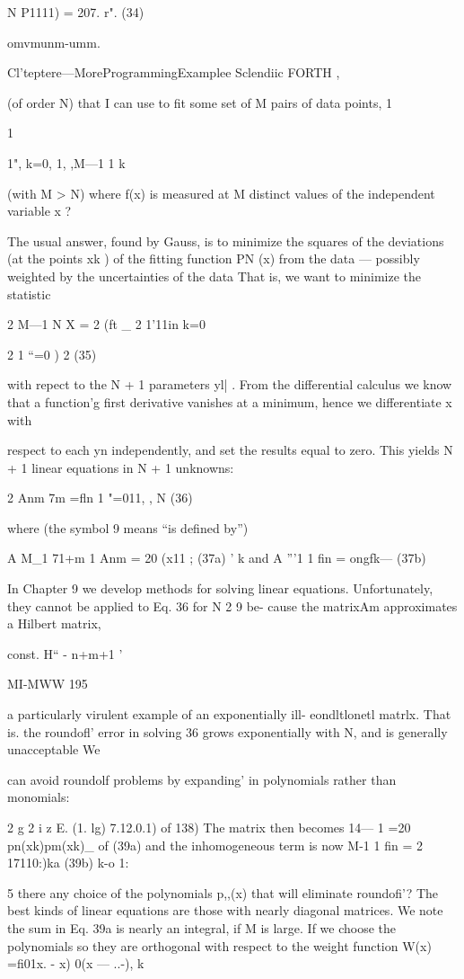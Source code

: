 N
P1111) = 207. r". (34)

omvmunm-umm.

Cl'teptere—MoreProgrammingExamplee Sclendiic FORTH ,

(of order N) that I can use to ﬁt some set of M pairs of data points, 1

1

{1"}, k=0, 1, ,M—1 1
k

(with M > N) where f(x) is measured at M distinct values of the
independent variable x ?

The usual answer, found by Gauss, is to minimize the squares of
the deviations (at the points xk ) of the ﬁtting function PN (x) from
the data — possibly weighted by the uncertainties of the data That
is, we want to minimize the statistic

2 M—1 N
X = 2 (ft _ 2 1’11in
k=0

2 1
“=0 ) 2 (35)

with repect to the N + 1 parameters yl| .
From the differential calculus we know that a function’g ﬁrst
derivative vanishes at a minimum, hence we differentiate x with

respect to each yn independently, and set the results equal to
zero. This yields N + 1 linear equations in N + 1 unknowns:

2 Anm 7m =ﬂn 1 "=011, , N (36)

where (the symbol 9 means “is deﬁned by”)

A M_1 71+m 1
Anm = 20 (x11 ; (37a)
' k
and
A ”'1 1
ﬁn = ongfk— (37b)

In Chapter 9 we develop methods for solving linear equations.
Unfortunately, they cannot be applied to Eq. 36 for N 2 9 be-
cause the matrixAm approximates a Hilbert matrix,

 

const.
H“ - n+m+1 ’

MI-MWW 195

a particularly virulent example of an exponentially ill-
eondltlonetl matrlx. That is. the roundofl' error in solving 36
grows exponentially with N, and is generally unacceptable We

can avoid roundolf problems by expanding' in polynomials rather
than monomials:

2 g 2 i
z E. (1. lg) 7.12.0.1) of 138)
The matrix then becomes
14— 1
=20 pn(xk)pm(xk)_ of (39a)
and the inhomogeneous term is now
M-1 1
ﬁn = 2 17110:)ka (39b)
k-o 1:

5 there any choice of the polynomials p,,(x) that will eliminate
roundoﬁ'? The best kinds of linear equations are those with
nearly diagonal matrices. We note the sum in Eq. 39a is nearly an
integral, if M is large. If we choose the polynomials so they are
orthogonal with respect to the weight function
W(x) =ﬁ01x. - x) 0(x — ..-),
k

